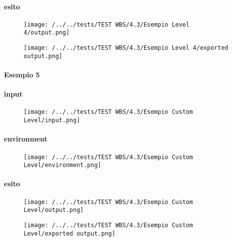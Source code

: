 \paragraph{esito}
\begin{figure}
\centering
\texttt{[image: /../../tests/TEST WBS/4.3/Esempio Level 4/output.png]}
\end{figure}
\begin{figure}
\centering
\texttt{[image: /../../tests/TEST WBS/4.3/Esempio Level 4/exported output.png]}
\end{figure}

\paragraph{Esempio 5}
\paragraph{input}
\begin{figure}
\centering
\texttt{[image: /../../tests/TEST WBS/4.3/Esempio Custom Level/input.png]}
\end{figure}
\paragraph{environment}
\begin{figure}
\centering
\texttt{[image: /../../tests/TEST WBS/4.3/Esempio Custom Level/environment.png]}
\end{figure}
\paragraph{esito}
\begin{figure}
\centering
\texttt{[image: /../../tests/TEST WBS/4.3/Esempio Custom Level/output.png]}
\end{figure}
\begin{figure}
\centering
\texttt{[image: /../../tests/TEST WBS/4.3/Esempio Custom Level/exported output.png]}
\end{figure}